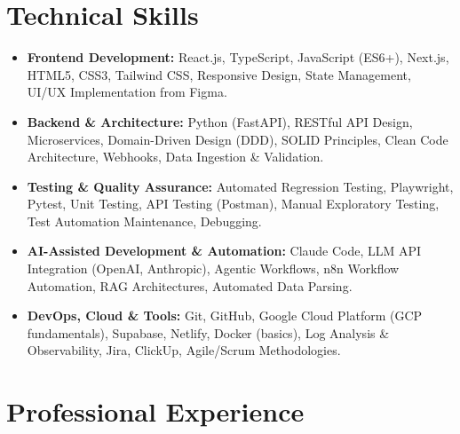 \documentclass[10pt,a4paper]{article}
\begin{document}
\section{Technical Skills}
\begin{itemize}[leftmargin=1em]
    \item \textbf{Frontend Development:} React.js, TypeScript, JavaScript (ES6+), Next.js, HTML5, CSS3, Tailwind CSS, Responsive Design, State Management, UI/UX Implementation from Figma.
    \item \textbf{Backend \& Architecture:} Python (FastAPI), RESTful API Design, Microservices, Domain-Driven Design (DDD), SOLID Principles, Clean Code Architecture, Webhooks, Data Ingestion \& Validation.
    \item \textbf{Testing \& Quality Assurance:} Automated Regression Testing, Playwright, Pytest, Unit Testing, API Testing (Postman), Manual Exploratory Testing, Test Automation Maintenance, Debugging.
    \item \textbf{AI-Assisted Development \& Automation:} Claude Code, LLM API Integration (OpenAI, Anthropic), Agentic Workflows, n8n Workflow Automation, RAG Architectures, Automated Data Parsing.
    \item \textbf{DevOps, Cloud \& Tools:} Git, GitHub, Google Cloud Platform (GCP fundamentals), Supabase, Netlify, Docker (basics), Log Analysis \& Observability, Jira, ClickUp, Agile/Scrum Methodologies.
\end{itemize}

\section{Professional Experience}
\end{document}
